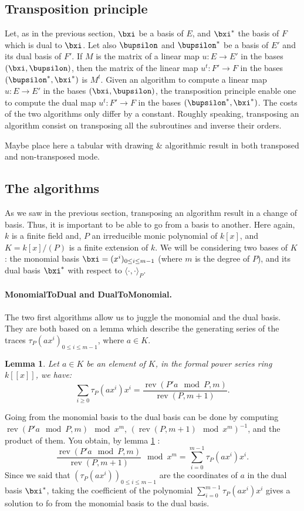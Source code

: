 \documentclass[a4paper,11pt]{article}
\theoremstyle{break}
\newtheorem{lm}[thm]{Lemma}
\theoremstyle{definition}
\theoremstyle{remark}
\DeclareMathOperator{\rev}{rev}
\newcommand{\ps}[2]{\langle#1,#2\rangle}
\newcommand{\psdot}{\ps{\cdot}{\cdot}}
\begin{document}
\subsection{Transposition principle}
Let, as in the previous section, $\bxi$ be a basis of $E$, and $\bxi^*$ the
basis of $F$ which is dual to $\bxi$. Let also $\bupsilon$ and $\bupsilon^*$ be 
a
basis of $E'$ and its dual basis of $F'$. If $M$ is the matrix of a linear map
$u:E\rightarrow E'$ in the
bases $(\bxi,\bupsilon)$, then the matrix of the linear map $u^t:F'\rightarrow 
F$ in the bases
$(\bupsilon^*,\bxi^*)$ is $M^t$. Given an algorithm to compute a linear map
$u:E\rightarrow E'$ in the bases $(\bxi,\bupsilon)$, the transposition principle
enable one to compute the dual map $u^t:F'\rightarrow F$ in the bases
$(\bupsilon^*,\bxi^*)$. The costs of the two algorithms only differ by a
constant. Roughly speaking, transposing an algorithm consist on transposing all
the subroutines and inverse their orders.
\begin{center}
  Maybe place here a tabular with drawing \& algorithmic result in both
  transposed and non-transposed mode. 
\end{center}
\subsection{The algorithms}
\label{sec-algo}
As we saw in the previous section, transposing an algorithm result in a change
of basis. Thus, it is important to be able to go from a basis to another. Here
again, $k$ is a finite field and, $P$ an irreducible monic polynomial of $k[x]$, 
and
$K=k[x]/(P)$ is a finite extension of $k$. We will be considering two bases of
$K$ : the monomial basis $\bxi=(x^i)_{0\leq i \leq m-1}$ (where $m$ is the
degree of $P$), and its dual basis $\bxi^*$ with respect to $\psdot_P$.

\paragraph{MonomialToDual and DualToMonomial.}The two
first algorithms allow us to juggle the monomial and the dual basis. They are
both based on a lemma which describe the generating series of the traces
$\tau_P(ax^i)_{0\leq i \leq m-1}$, where $a\in K$. 
\begin{lm}
  \label{lm-basis}
  Let $a\in K$ be an element of $K$, in the formal power series ring $k[[x]]$,
  we have:
  \[
    \sum_{i\geq 0}\tau_P(ax^i)x^i=\frac{\rev(P'a\mod P,m)}{\rev(P,m+1)}.
  \]
\end{lm}
Going from the monomial basis to the dual basis can be done by computing
$\rev(P'a\mod P,m)\mod x^m$, $(\rev(P,m+1)\mod x^m)^{-1}$, and the product of
them. You obtain, by lemma \ref{lm-basis} :
\[
  \frac{\rev(P'a\mod P,m)}{\rev(P,m+1)}\mod x^m=\sum_{i=0}^{m-1}\tau_P(ax^i)x^i.
\]
Since we said that
$(\tau_P(ax^i))_{0\leq i \leq m-1}$ are the coordinates of $a$ in the dual basis
$\bxi^*$, taking the coefficient of the polynomial
$\sum_{i=0}^{m-1}\tau_P(ax^i)x^i$ gives a solution to fo from the monomial basis
to the dual basis.
\end{document}
